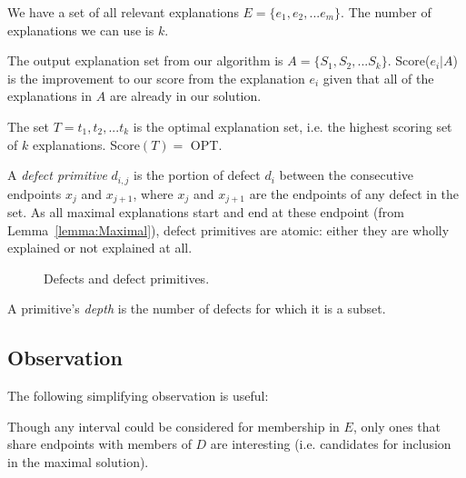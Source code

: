 \documentclass[11pt,twocolumn]{article}
\begin{document}
We have a set of all relevant explanations $E = \{e_1, e_2, ... e_m\}$.  The number of explanations we can use is $k$.

The output explanation set from our algorithm is $A = \{S_1, S_2, ... S_k\}$.  Score($e_i | A$) is the improvement to our score from the explanation $e_i$ given that all of the explanations in $A$ are already in our solution.

The set $T = t_1, t_2, ... t_k$ is the optimal explanation set, i.e. the highest scoring set of $k$ explanations.  Score$(T) = $ OPT.

A {\it defect primitive} $d_{i,j}$ is the portion of defect $d_i$ between the consecutive endpoints $x_j$ and $x_{j+1}$, where $x_j$ and $x_{j+1}$ are the endpoints of any defect in the set.  As all maximal explanations start and end at these endpoint (from Lemma~\ref{lemma:Maximal}), defect primitives are atomic: either they are wholly explained or not explained at all.

\begin{figure}[H]
  \caption{{\color{green} Defects} and {\color{blue} defect primitives}.}
  \label{fig:defectPrimitives}
\end{figure}

A primitive's {\it depth} is the number of defects for which it is a subset.  

\subsection{Observation}

The following simplifying observation is useful:

\begin{lem} \label{lemma:Maximal}
Though any interval could be considered for membership in $E$, only ones that share endpoints with members of $D$ are interesting (i.e. candidates for inclusion in the maximal solution).  
\end{lem}
\end{document}

